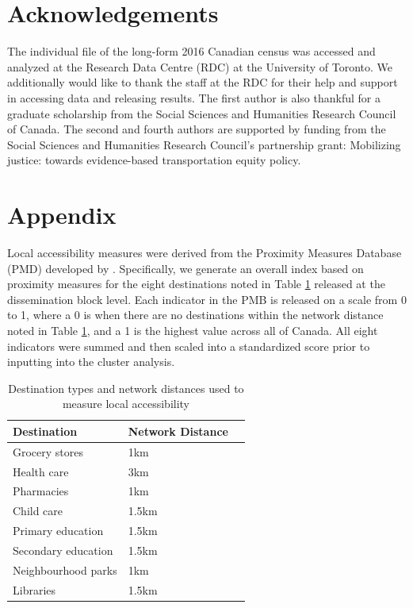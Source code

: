 \documentclass[10 pt,letterpaper]{article}
\renewcommand{\baselinestretch}{1.11}
\begin{document}
\section{Acknowledgements}

The individual file of the long-form 2016 Canadian census was accessed and analyzed at the Research Data Centre (RDC) at the University of Toronto. We additionally would like to thank the staff at the RDC for their help and support in accessing data and releasing results. The first author is also thankful for a graduate scholarship from the Social Sciences and Humanities Research Council of Canada. The second and fourth authors are supported by funding from the Social Sciences and Humanities Research Council’s partnership grant: Mobilizing justice: towards evidence-based transportation equity policy.




\section*{Appendix}

Local accessibility measures were derived from the Proximity Measures Database (PMD) developed by . Specifically, we generate an overall index based on proximity measures for the eight destinations noted in Table \ref{table:pmd} released at the dissemination block level. Each indicator in the PMB is released on a scale from 0 to 1, where a 0 is when there are no destinations within the network distance noted in Table \ref{table:pmd}, and a 1 is the highest value across all of Canada. All eight indicators were summed and then scaled into a standardized score prior to inputting into the cluster analysis.

\begin{table}[h]
	\small
	\centering
	\caption{{Destination types and network distances used to measure local accessibility}}
	\label{table:pmd}
	\begin{tabular}{lll}
		\hline
		\textbf{Destination}    & \textbf{Network Distance}   \\ \hline
		Grocery stores & 1km \\
		Health care & 3km \\
		Pharmacies & 1km \\
		Child care & 1.5km \\
		Primary education & 1.5km \\
		Secondary education & 1.5km \\
		Neighbourhood parks & 1km \\
		Libraries & 1.5km \\ 
		\hline
	\end{tabular}
\end{table}
	

\renewcommand{\baselinestretch}{1.1} 



\end{document}
